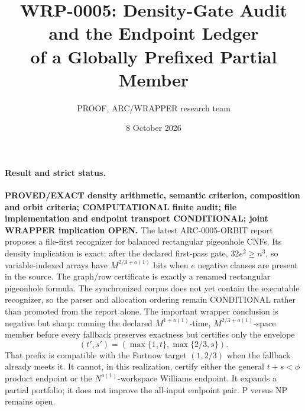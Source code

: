 \documentclass[11pt]{article}
\title{WRP-0005: Density-Gate Audit and the Endpoint Ledger\\of a Globally Prefixed Partial Member}
\author{PROOF, ARC/WRAPPER research team}
\date{8 October 2026}
\begin{document}
\maketitle

\paragraph{Result and strict status.}
\textbf{PROVED/EXACT density arithmetic, semantic criterion, composition and
orbit criteria; COMPUTATIONAL finite audit; file implementation and endpoint
transport CONDITIONAL; joint WRAPPER implication OPEN.}
The latest ARC-0005-ORBIT report proposes a file-first recognizer for balanced
rectangular pigeonhole CNFs.  Its density implication is exact: after the
declared first-pass gate, $32e^2\ge n^3$, so variable-indexed arrays have
$M^{2/3+o(1)}$ bits when $e$ negative clauses are present in the source.  The
graph/row certificate is exactly a renamed rectangular pigeonhole formula.
The synchronized corpus does not yet contain the executable recognizer, so
the parser and allocation ordering remain CONDITIONAL rather than promoted
from the report alone.  The important wrapper conclusion is negative but
sharp:
running the declared $M^{1+o(1)}$-time,
$M^{2/3+o(1)}$-space member before every fallback preserves exactness but
certifies only the envelope
\[
  (t',s')=(\max\{1,t\},\max\{2/3,s\}).
\]
That prefix is compatible with the Fortnow target $(1,2/3)$ when the fallback
already meets it.  It cannot, in this realization, certify either the general
$t+s<\phi$ product endpoint or the $N^{o(1)}$-workspace Williams endpoint.
It expands a partial portfolio; it does not improve the all-input endpoint
pair.  P versus NP remains open.
\end{document}
